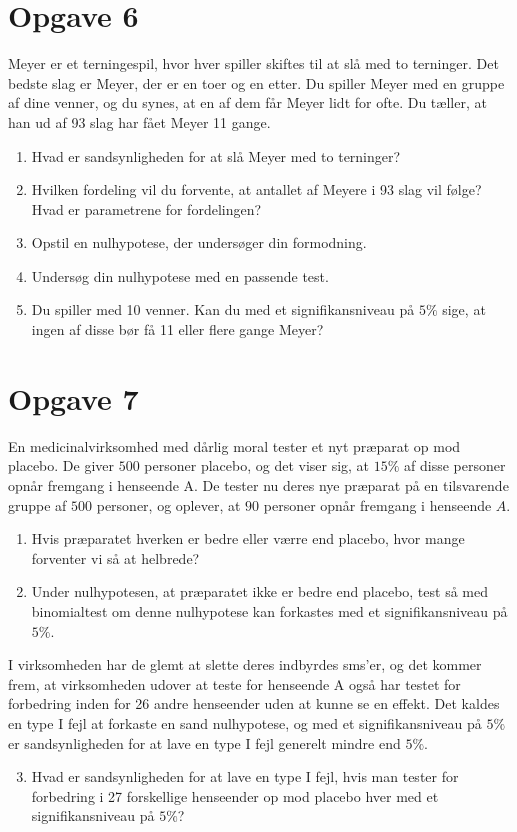 \section*{Opgave 6}
Meyer er et terningespil, hvor hver spiller skiftes til at slå med to terninger. Det bedste slag er Meyer, der er en toer og en etter. Du spiller Meyer med en gruppe af dine venner, og du synes, at en af dem får Meyer lidt for ofte. Du tæller, at han ud af 93 slag har fået Meyer 11 gange.
\begin{enumerate}[label=\roman*)]
\item Hvad er sandsynligheden for at slå Meyer med to terninger?
\item Hvilken fordeling vil du forvente, at antallet af Meyere i 93 slag vil følge? Hvad er parametrene for fordelingen?
\item Opstil en nulhypotese, der undersøger din formodning.
\item Undersøg din nulhypotese med en passende test. 
\item Du spiller med 10 venner. Kan du med et signifikansniveau på $5\%$ sige, at ingen af disse bør få 11 eller flere gange Meyer?
\end{enumerate}

\section*{Opgave 7}
En medicinalvirksomhed med dårlig moral tester et nyt præparat op mod placebo. De giver $500$ personer placebo, og det viser sig, at $15\%$ af disse personer opnår fremgang i henseende A. De tester nu deres nye præparat på en tilsvarende gruppe af $500$ personer, og oplever, at $90$ personer opnår fremgang i henseende $A$. 
\begin{enumerate}[label=\roman*)]
\item Hvis præparatet hverken er bedre eller værre end placebo, hvor mange forventer vi så at helbrede?
\item Under nulhypotesen, at præparatet ikke er bedre end placebo, test så med binomialtest om denne nulhypotese kan forkastes med et signifikansniveau på $5\%$.
\end{enumerate}
I virksomheden har de glemt at slette deres indbyrdes sms'er, og det kommer frem, at virksomheden udover at teste for henseende A også har testet for forbedring inden for 26 andre henseender uden at kunne se en effekt. Det kaldes en type I fejl at forkaste en sand nulhypotese, og med et signifikansniveau på $5\%$ er sandsynligheden for at lave en type I fejl generelt mindre end $5\%$. 
\begin{enumerate}[label=\roman*)]
\setcounter{enumi}{2}
\item Hvad er sandsynligheden for at lave en type I fejl, hvis man tester for forbedring i 27 forskellige henseender op mod placebo hver med et signifikansniveau på $5\%$?
\end{enumerate}